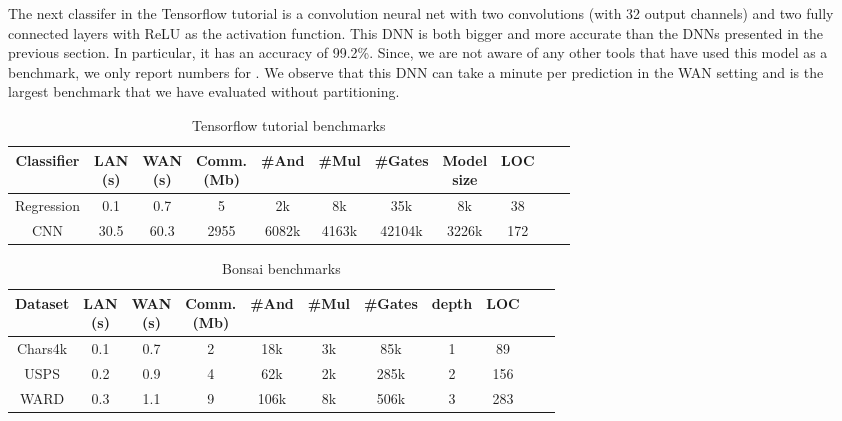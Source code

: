 The next classifer in the Tensorflow tutorial is a convolution neural net with two convolutions
(with 32 output channels) and two fully connected layers with ReLU as the activation function.
This DNN is both bigger and more accurate than the DNNs presented in the previous section.
In particular, it has an accuracy of 99.2\%.
Since, we are not aware of any other tools that have used this
model as a benchmark, we only report numbers for \tool.
We observe that this DNN can take a minute per prediction in the WAN
setting and is the largest benchmark that we have evaluated without
partitioning.


\setlength\tabcolsep{2.5pt}
\begin{table}
\begin{tabular}{|c|c|c|c |c|c|c|c|c|c | c}
\hline
Classifier       & \thead{LAN  \\ (s)} & \thead{WAN \\(s)} & \thead{Comm. \\(Mb)}  & \#And & \#Mul & \#Gates & \thead{Model \\size} & LOC\\
\hline
Regression &  0.1         & 0.7         & 5            & 2k    & 8k    &  35k    & 8k   & 38\\
\hline
CNN        &  30.5        & 60.3        & 2955         & 6082k & 4163k &  42104k & 3226k& 172\\
\hline
\end{tabular}

 \caption{Tensorflow tutorial benchmarks}
 \label{tab:tf} 
\end{table}
\setlength\tabcolsep{3.5pt}
\begin{table}
\begin{tabular}{|c|c|c|c |c|c|c|c|c|c | c|}
\hline
Dataset       & \thead{LAN \\(s)} & \thead{WAN \\(s)} & \thead{Comm. \\ (Mb)}  & \#And & \#Mul & \#Gates & depth & LOC\\
\hline
Chars4k    &  0.1         & 0.7         & 2            & 18k    & 3k    &  85k     & 1   & 89\\
\hline
USPS       &  0.2         & 0.9         & 4            & 62k    & 2k    &  285k    & 2   & 156\\
\hline
WARD       &  0.3         & 1.1         & 9            & 106k    & 8k    &  506k    & 3   & 283\\
\hline
\end{tabular}

 \caption{Bonsai benchmarks}
 \label{tab:bonsai} 
\end{table}

